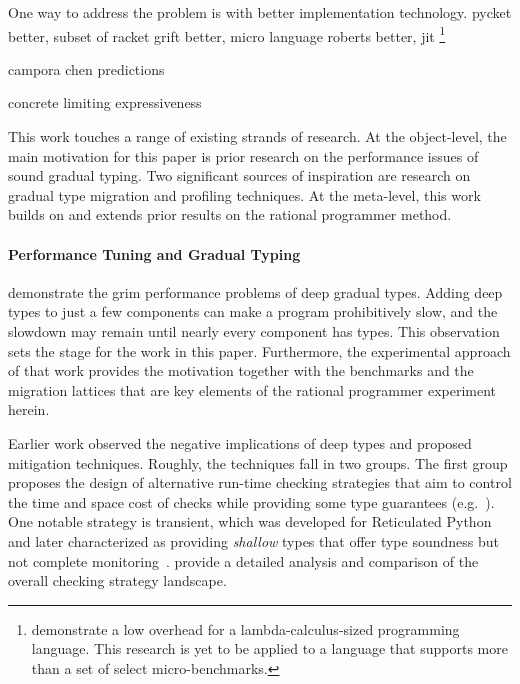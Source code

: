 One way to address the problem is with better implementation
technology.
pycket better, subset of racket
grift better, micro language
roberts better, jit
\footnote{\citet{kas-pldi-2019}
demonstrate a low overhead for a lambda-calculus-sized programming
language. This research is yet to be applied to a language that supports more
than a set of select micro-benchmarks.}

campora chen predictions

concrete limiting expressiveness



This work touches a range of existing strands of research. At
the object-level, the main motivation for this paper is prior research on
the performance issues of sound gradual typing.
Two significant
sources of inspiration are research on gradual type migration and
profiling techniques.  At the meta-level, this work builds on and extends
prior results on the rational programmer method.

\paragraph{Performance Tuning and Gradual Typing} 

\citet{gtnffvf-jfp-2019} demonstrate the grim performance problems of deep
gradual types.
Adding deep types to just a few components can make a program prohibitively
slow, and the slowdown may remain until nearly every component has types.
This observation sets the stage for the work in this paper.
Furthermore, the experimental approach of that work provides the
motivation together with the benchmarks and the migration lattices that
are key elements of the rational programmer experiment herein.

Earlier work observed the negative implications of deep types
and proposed mitigation techniques.
Roughly, the techniques fall in two groups. The first
group proposes the design of alternative run-time checking strategies that
aim to control the time and space cost of checks while providing
some type guarantees (e.g.~\citep{sgt-esop-2009,rmhn-ecoop-2019,glfd-pj-2022,lgmvpk-pj-2023,g-popl-2015,svctg-esop-2015,rat-oopsla-2017,sfrbcsb-popl-2014,rsfbv-popl-2015,coersion-passing-style}).
One notable strategy is transient, which was developed for Reticulated
Python~\cite{vksb-dls-2014,vss-popl-2017,vsc-dls-2019,v-thesis-2019}
and later characterized as providing \emph{shallow} types that offer
type soundness but not complete monitoring~\cite{gfd-oopsla-2019}.
\citet{type-untyped} provide a detailed analysis and comparison of the
overall checking strategy landscape.

